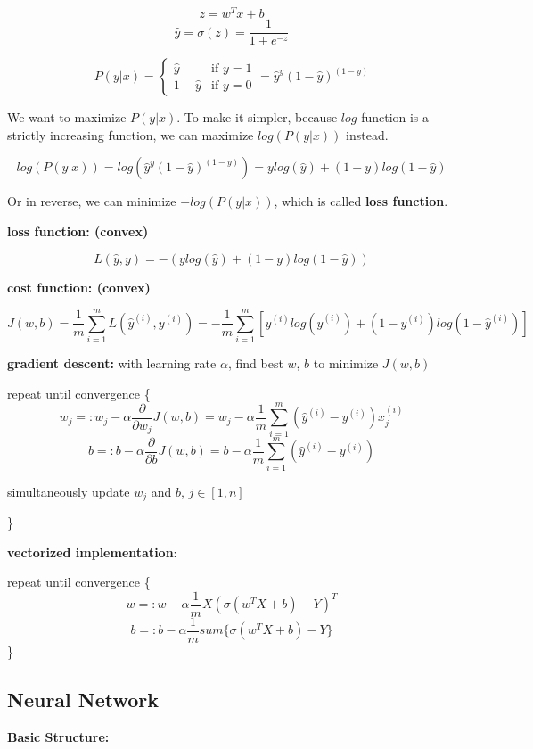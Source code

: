 \documentclass{article}
\begin{document}
\[z = w^Tx + b\]
\[\hat{y} = \sigma(z) = \frac {1}{1+e^{-z}}\]

\[P(y|x) = \begin{cases}\hat{y}&{\text{if }}y = 1\\1 -\hat{y}&{\text{if }}y = 0\end{cases} = \hat{y}^y (1 - \hat{y})^{(1 - y)}\]

\noindent We want to maximize \(P(y|x)\). To make it simpler, because \(log\) function is a strictly increasing function, we can maximize \(log(P(y|x))\) instead.

\[log(P(y|x)) = log(\hat{y}^y (1 - \hat{y})^{(1 - y)}) = ylog(\hat{y}) + (1 - y)log(1 - \hat{y})\]

\noindent Or in reverse, we can minimize \(-log(P(y|x))\), which is called \textbf{loss function}.

\noindent \textbf{loss function: (convex)}

\[L(\hat{y}, y) = -(ylog(\hat{y}) + (1 - y)log(1 - \hat{y}))\]

\noindent \textbf{cost function: (convex)}

\[J(w, b) = \frac{1}{m} \sum^m_{i = 1} L(\hat{y}^{(i)}, y^{(i)}) = - \frac{1}{m} \sum^m_{i = 1} [y^{(i)}log(\hat{y}^{(i)}) + (1 - y^{(i)})log(1 - \hat{y}^{(i)})]\]

\noindent \textbf{gradient descent:} with learning rate \(\alpha\), find best \(w\), \(b\) to minimize \(J(w, b)\)

\noindent repeat until convergence \{
\[w_j =: w_j - \alpha \frac{\partial}{\partial w_j} J(w, b) = w_j - \alpha \frac{1}{m} \sum^m_{i = 1} (\hat{y}^{(i)} - y^{(i)}) x^{(i)}_j\]
\[b =: b - \alpha \frac{\partial}{\partial b} J(w, b) = b - \alpha \frac{1}{m} \sum^m_{i = 1} (\hat{y}^{(i)} - y^{(i)})\]
\centerline{simultaneously update \(w_j\) and \(b\), \(j \in [1, n]\)}
\}

\bigskip

\noindent \textbf{vectorized implementation}:

\noindent repeat until convergence \{
\[w =: w - \alpha \frac{1}{m} X (\sigma(w^TX + b) - Y)^T\]
\[b =: b - \alpha \frac{1}{m} sum\{\sigma(w^TX + b) - Y\}\]
\}

\subsection{Neural Network}

\noindent \textbf{Basic Structure:}
\end{document}
